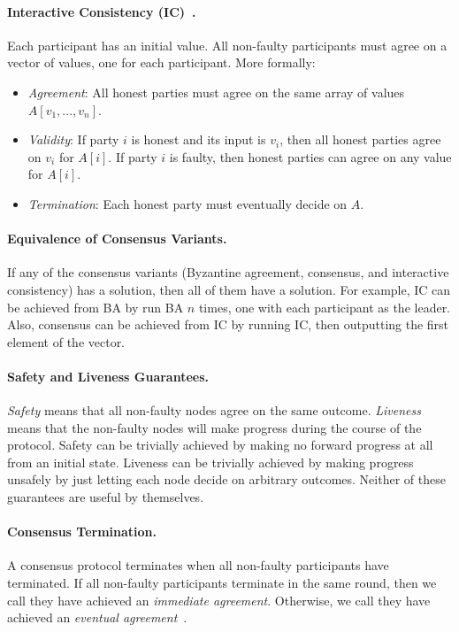 \documentclass[11pt]{article}
\theoremstyle{mytheoremstyle}
\begin{document}
\paragraph{Interactive Consistency (IC)~\cite{pease80reaching}.} Each participant has an initial value. All non-faulty participants must agree on a vector of values, one for each participant. More formally:
\begin{itemize}
\item \emph{Agreement}: All honest parties must agree on the same array of values $A[v_1,...,v_n]$. 
\item \emph{Validity}: If party $i$ is honest and its input is $v_i$, then all honest parties agree on $v_i$ for $A[i]$. If party $i$ is faulty, then honest parties can agree on any value for $A[i]$.
\item \emph{Termination}: Each honest party must eventually decide on $A$.
\end{itemize}

\paragraph{Equivalence of Consensus Variants.} If any of the consensus variants (Byzantine agreement, consensus, and interactive consistency) has a solution, then all of them have a solution. For example, IC can be achieved from BA by run BA $n$ times, one with each participant as the leader. Also, consensus can be achieved from IC by running IC, then outputting the first element of the vector.

\paragraph{Safety and Liveness Guarantees.} \emph{Safety} means that all non-faulty nodes agree on the same outcome. \emph{Liveness} means that the non-faulty nodes will make progress during the course of the protocol. Safety can be trivially achieved by making no forward progress at all from an initial state. Liveness can be trivially achieved by making progress unsafely by just letting each node decide on arbitrary outcomes. Neither of these guarantees are useful by themselves.

\paragraph{Consensus Termination.} A consensus protocol terminates when all non-faulty participants have terminated. If all non-faulty participants terminate in the same round, then we call they have achieved an \emph{immediate agreement}. Otherwise, we call they have achieved an \emph{eventual agreement}~\cite{fischer}.
\end{document}
